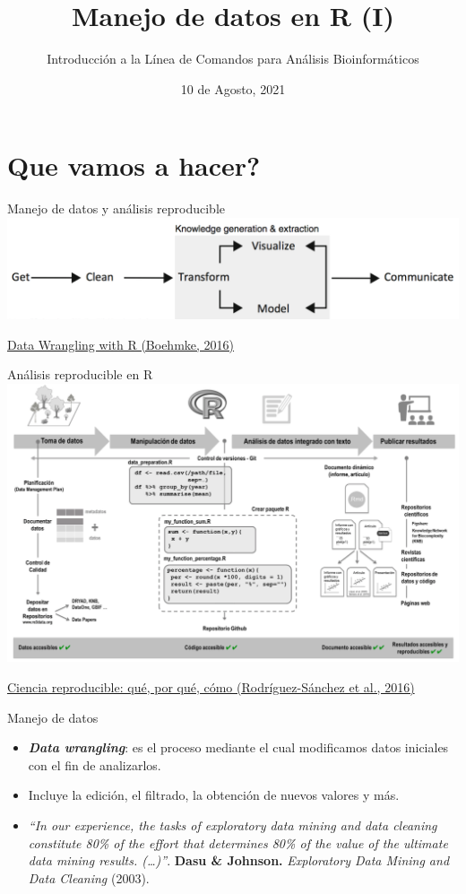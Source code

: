 \documentclass[
  ignorenonframetext,
]{beamer}
\title{Manejo de datos en R (I)}
\author{Introducción a la Línea de Comandos para Análisis
Bioinformáticos}
\date{10 de Agosto, 2021}
\providecommand{\tightlist}{%
  \setlength{\itemsep}{0pt}\setlength{\parskip}{0pt}}
\begin{document}
\frame{\titlepage}

\hypertarget{que-vamos-a-hacer}{%
\section{Que vamos a hacer?}\label{que-vamos-a-hacer}}

\begin{frame}{Manejo de datos y análisis reproducible}
\protect\hypertarget{manejo-de-datos-y-anuxe1lisis-reproducible}{}
\includegraphics{../../imgs/analytic_process.png}

\href{http://93.174.95.29/_ads/6F902E466A32011DD94E2B6EEE505F9F}{Data
Wrangling with R (Boehmke, 2016)}
\end{frame}

\begin{frame}{Análisis reproducible en R}
\protect\hypertarget{anuxe1lisis-reproducible-en-r}{}
\includegraphics{../../imgs/analytic_process_R.png}

\href{}{Ciencia reproducible: qué, por qué, cómo (Rodríguez-Sánchez et
al., 2016)}

\end{frame}

\begin{frame}{Manejo de datos}
\protect\hypertarget{manejo-de-datos}{}
\begin{itemize}
\tightlist
\item
  \textbf{\emph{Data wrangling}}: es el proceso mediante el cual
  modificamos datos iniciales con el fin de analizarlos.
\item
  Incluye la edición, el filtrado, la obtención de nuevos valores y más.
\item
  \emph{``In our experience, the tasks of exploratory data mining and
  data cleaning constitute 80\% of the effort that determines 80\% of
  the value of the ultimate data mining results. (\ldots)''}.
  \textbf{Dasu \& Johnson.} \emph{Exploratory Data Mining and Data
  Cleaning} (2003).
\end{itemize}
\end{frame}
\end{document}
